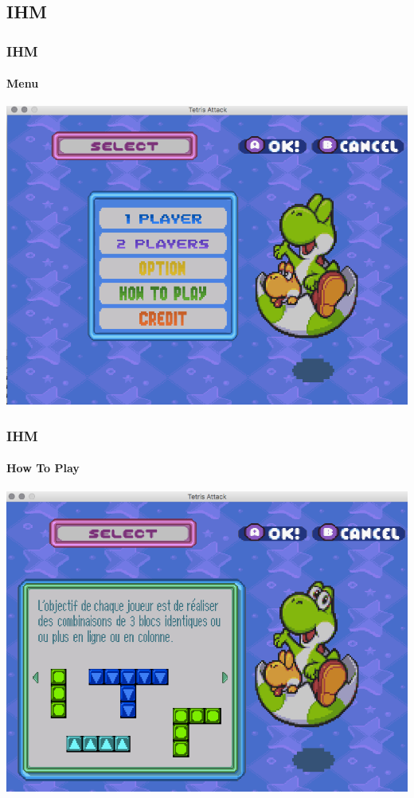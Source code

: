 \documentclass{beamer}
\begin{document}
\begin{darkframes}
   \section{IHM}
 \begin{frame}
 	 \frametitle{IHM}
 	 \begin{center}
 	 \framesubtitle{Menu}
		\includegraphics[scale=0.40]{./Image/menu.png}
		\end{center}
    \end{frame}
    
     \begin{frame}
 	 \frametitle{IHM}
 	 \begin{center}
 	 \framesubtitle{How To Play}
		\includegraphics[scale=0.40]{./Image/howtoplay.png}
		\end{center}
    \end{frame}
    

\end{darkframes}
\end{document}
